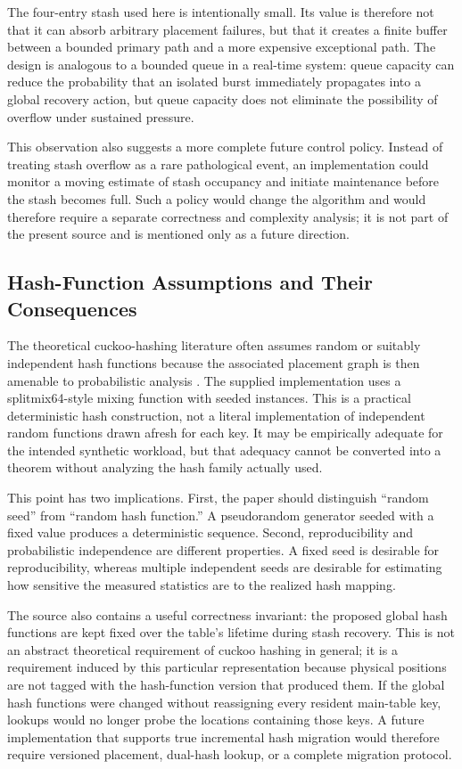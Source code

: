 \documentclass[conference]{IEEEtran}
\begin{document}
The four-entry stash used here is intentionally small. Its value is therefore
not that it can absorb arbitrary placement failures, but that it creates a
finite buffer between a bounded primary path and a more expensive exceptional
path. The design is analogous to a bounded queue in a real-time system: queue
capacity can reduce the probability that an isolated burst immediately
propagates into a global recovery action, but queue capacity does not eliminate
the possibility of overflow under sustained pressure.

This observation also suggests a more complete future control policy. Instead
of treating stash overflow as a rare pathological event, an implementation
could monitor a moving estimate of stash occupancy and initiate maintenance
before the stash becomes full. Such a policy would change the algorithm and
would therefore require a separate correctness and complexity analysis; it is
not part of the present source and is mentioned only as a future direction.

\subsection{Hash-Function Assumptions and Their Consequences}
\label{subsec:discussion_hash}

The theoretical cuckoo-hashing literature often assumes random or suitably
independent hash functions because the associated placement graph is then
amenable to probabilistic analysis \cite{dietzfelbinger2009tight,aumuller2014explicit}.
The supplied implementation uses a splitmix64-style mixing function with
seeded instances. This is a practical deterministic hash construction, not a
literal implementation of independent random functions drawn afresh for each
key. It may be empirically adequate for the intended synthetic workload, but
that adequacy cannot be converted into a theorem without analyzing the hash
family actually used.

This point has two implications. First, the paper should distinguish ``random
seed'' from ``random hash function.'' A pseudorandom generator seeded with a
fixed value produces a deterministic sequence. Second, reproducibility and
probabilistic independence are different properties. A fixed seed is desirable
for reproducibility, whereas multiple independent seeds are desirable for
estimating how sensitive the measured statistics are to the realized hash
mapping.

The source also contains a useful correctness invariant: the proposed global
hash functions are kept fixed over the table's lifetime during stash recovery.
This is not an abstract theoretical requirement of cuckoo hashing in general;
it is a requirement induced by this particular representation because physical
positions are not tagged with the hash-function version that produced them.
If the global hash functions were changed without reassigning every resident
main-table key, lookups would no longer probe the locations containing those
keys. A future implementation that supports true incremental hash migration
would therefore require versioned placement, dual-hash lookup, or a complete
migration protocol.
\end{document}
